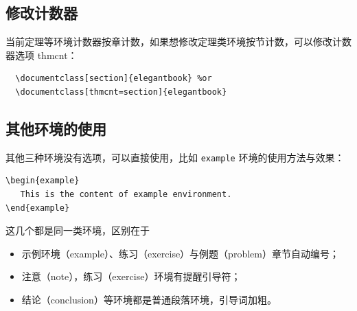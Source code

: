 \documentclass[lang=cn,10pt,cite=super]{elegantbook}
\begin{document}
 


\subsection{修改计数器}

当前定理等环境计数器按章计数，如果想修改定理类环境按节计数，可以修改计数器选项 thmcnt：

\begin{lstlisting}
  \documentclass[section]{elegantbook} %or
  \documentclass[thmcnt=section]{elegantbook}
\end{lstlisting}


\subsection{其他环境的使用}

其他三种环境没有选项，可以直接使用，比如 \lstinline{example} 环境的使用方法与效果：
\begin{lstlisting}
\begin{example}
   This is the content of example environment.
\end{example}
\end{lstlisting}

这几个都是同一类环境，区别在于

\begin{itemize}
  \item 示例环境（example）、练习（exercise）与例题（problem）章节自动编号；
  \item 注意（note），练习（exercise）环境有提醒引导符；
  \item 结论（conclusion）等环境都是普通段落环境，引导词加粗。
\end{itemize}
\end{document}
